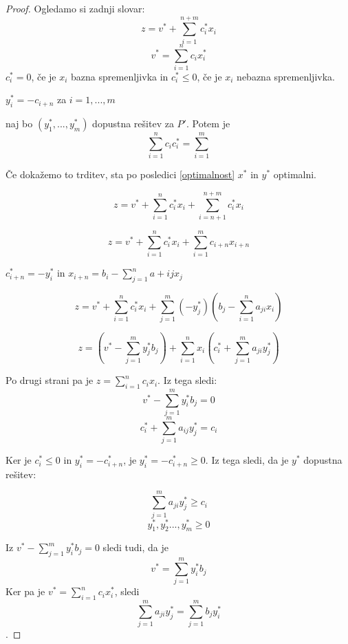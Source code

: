 \documentclass[11pt, a4paper]{article}
\begin{document}
    \begin{proof}
        Ogledamo si zadnji slovar:
        \[z=v^* + \sum_{i=1}^{n+m} c_i^*x_i\]
        \[v^* = \sum_{i=1}^{n} c_i x_i^*\]
        \(c_i^*=0\), če je \(x_i\) bazna spremenljivka in \(c_i^* \le 0\), če je \(x_i\) nebazna spremenljivka.
        \begin{center}
            \(y_i^* = -c_{i+n}\) za \(i=1,...,m\)
        \end{center}
        
        \begin{proposition}
            naj bo \((y_1^*,...,y_m^*)\) dopustna rešitev za \(P'\). Potem je \[\sum_{i=1}^n c_i c_i^* = \sum_{i=1}^m\]
        \end{proposition}

        Če dokažemo to trditev, sta po posledici \ref{optimalnost} \(x^*\) in \(y^*\) optimalni.

        \[z = v^* + \sum_{i=1}^n c_i^* x_i + \sum_{i=n+1}^{n+m} c_i^* x_i\]
        
        \[z = v^* + \sum_{i=1}^n c_i^* x_i + \sum_{i=1}^m c_{i+n} x_{i+n}\]
       
        \begin{center}
            \(c_{i+n}^* = -y_i^*\) in \(x_{i+n} = b_i - \sum_{j=1}^n a+{ij} x_j\)
        \end{center}
        
        \[z = v^* +\sum_{i=1}^n c_i^* x_i + \sum_{j=1}^m (-y_j^*)(b_j - \sum_{i=1}^n a_{ji} x_i)\]
        
        \[z = (v^* - \sum_{j=1}^m y_j^* b_j) + \sum_{i=1}^n x_i (c_i^* + \sum_{j=1}^m a_{ji} y_j^*)\]

        Po drugi strani pa je \(z = \sum_{i=1}^n c_i x_i\). Iz tega sledi:
        \[v^* - \sum_{j=1}^m y_i^* b_j = 0\]
        \[c_i^* + \sum_{j=1}^m a_{ij} y_j^* = c_i\]

        Ker je \(c_i^* \le 0\) in \(y_i^* = -c_{i+n}^*\), je \(y_i^* = -c_{i+n}^* \ge 0\). Iz tega sledi, da je \(y^*\) dopustna rešitev:

        \[\sum_{j=1}^m a_{ji} y_j^* \ge c_i\]
        \[y_1^*,y_2^*...,y_m^* \ge 0\]

        Iz \(v^* - \sum_{j=1}^m y_i^* b_j = 0\) sledi tudi, da je 
        \[v^* = \sum_{j=1}^m y_i^* b_j\]
        Ker pa je \(v^* = \sum_{i=1}^{n} c_i x_i^*\), sledi 
        \[\sum_{j=1}^m a_{ji} y_j^* = \sum_{j=1}^m b_j y_i^*\].
    \end{proof}
\end{document}
